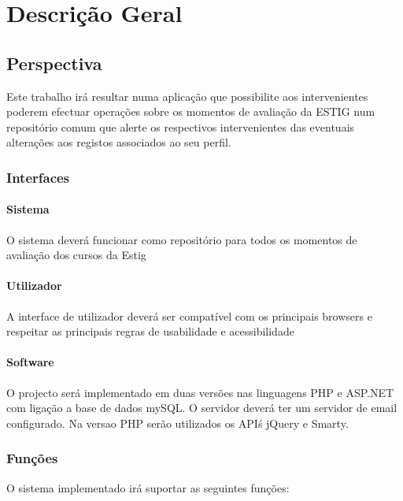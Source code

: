 

\chapter{Descrição Geral}

\paragraph{}

\section{Perspectiva}
Este trabalho irá resultar numa aplicação que possibilite aos intervenientes poderem efectuar operações sobre os momentos de avaliação da ESTIG num repositório comum que alerte os respectivos intervenientes das eventuais alterações aos registos associados ao seu perfil.\\

\subsection{Interfaces}
\subsubsection{Sistema}
O sistema deverá funcionar como repositório para todos os momentos de avaliação dos cursos da Estig

\subsubsection{Utilizador}
A interface de utilizador deverá ser compatível com os principais browsers e respeitar as principais regras de usabilidade e acessibilidade

\subsubsection{Software}
O projecto será implementado em duas versões nas linguagens PHP e ASP.NET com ligação a base de dados mySQL. O servidor deverá ter um servidor de email configurado. Na versao PHP serão utilizados os API\'s jQuery e Smarty.

\subsection{Funções}
O sistema implementado irá suportar as seguintes funções:

